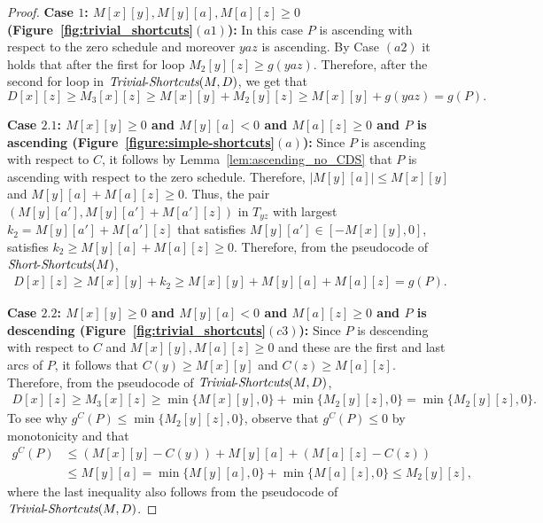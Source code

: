 \documentclass[11pt]{article}
\newcommand{\Simple}{\mbox{{\it Short}-{\it Shortcuts}}}
\newcommand{\Trivial}{\mbox{{\it Trivial}-{\it Shortcuts}}}
\begin{document}
\begin{proof}
    \textbf{Case $1$: $M[x][y],M[y][a],M[a][z]\ge 0$ (Figure~\ref{fig:trivial_shortcuts}$(a1)$):}
    In this case $P$ is ascending with respect to the zero schedule and moreover $yaz$ is ascending. By Case $(a2)$ it holds that after the first for loop $M_2[y][z]\ge g(yaz)$. Therefore, after the second for loop in $\Trivial(M,D)$, we get that 
    $$D[x][z] \ge M_3[x][z] \ge M[x][y]+M_2[y][z]\ge M[x][y] + g(yaz)=g(P).$$

    \textbf{Case $2.1$: $M[x][y] \ge 0$ and $M[y][a] < 0$ and $M[a][z]\ge 0$ and $P$ is ascending (Figure~\ref{figure:simple-shortcuts}$(a)$):}
    Since $P$ is ascending with respect to $C$, it follows by Lemma~\ref{lem:ascending_no_CDS} that $P$ is ascending with respect to the zero schedule. Therefore, $|M[y][a]|\le M[x][y]$ and $M[y][a]+M[a][z]\ge 0$. Thus, the pair $(M[y][a'], M[y][a'] +M[a'][z])$ in $T_{yz}$ with largest $k_2=M[y][a']+M[a'][z]$ that satisfies $M[y][a'] \in [-M[x][y],0]$, satisfies $k_2 \ge M[y][a] +M[a][z] \ge 0$. Therefore, from the pseudocode of $\Simple(M)$,
    \begin{align*}
        D[x][z] \ge M[x][y] + k_2 \ge
        M[x][y] + M[y][a] + M[a][z] = g(P).
    \end{align*}
    

    \textbf{Case $2.2$: $M[x][y]\ge 0$ and $M[y][a] < 0$ and $M[a][z]\ge 0$ and $P$ is descending (Figure~\ref{fig:trivial_shortcuts}$(c3)$):}
    Since $P$ is descending with respect to $C$ and $M[x][y],M[a][z]\ge 0$ and these are the first and last arcs of $P$, it follows that $C(y)\ge M[x][y]$ and $C(z)\ge M[a][z]$.
    Therefore, from the pseudocode of $\Trivial(M,D)$,
    \begin{align*}
      D[x][z] \ge M_3[x][z] \ge \min\{M[x][y],0\} + \min\{M_2[y][z],0\} = \min\{M_2[y][z],0\}.
    \end{align*}
    To see why $g^C(P) \le \min\{M_2[y][z],0\}$, observe that $g^C(P) \le 0$ by monotonicity and that 
    \begin{align*}
      g^C(P) &\le 
      (M[x][y]-C(y)) + M[y][a] + (M[a][z]-C(z)) \\
      &\le
      M[y][a] = \min\{M[y][a],0\} +  \min\{M[a][z],0\} \le M_2[y][z],
    \end{align*}
    where the last inequality also follows from the pseudocode of $\Trivial(M,D)$.


\end{proof}
\end{document}
